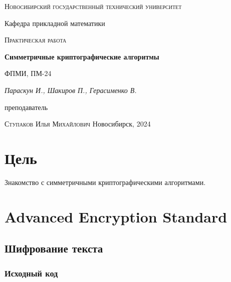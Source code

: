 \documentclass[12pt, a4paper]{article}
\begin{document}
\begin{titlepage}
  \centering
  \textsc{Новосибирский государственный технический университет}\par
  \vspace{1mm}
  Кафедра прикладной математики\par
  \vspace{4cm}
  \textsc{Практическая работа }\par
  {\huge\bfseries Симметричные криптографические алгоритмы\par}
  \vspace{1cm}
  {\scriptsize ФПМИ, ПМ-24\par}
  \vspace{1mm}
  {\itshape\large Параскун И., Шакиров П., Герасименко В.\par}
  \vfill
  {\small преподаватель\par}
  \vspace{1mm}
  \textsc{Ступаков Илья Михайлович}
  \vfill
  \large{Новосибирск, 2024}
\end{titlepage}

\newpage

\section{Цель}
Знакомство с симметричными криптографическими алгоритмами.

\section{Advanced Encryption Standard}
\subsection{Шифрование текста}

\subsubsection{Исходный код}
\inputminted[lastline=82]{go}{/home/mehandes/go/src/github.com/meha4j/cry/pkg/aex/aex.go}
\end{document}
